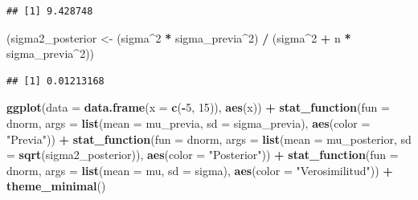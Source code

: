 \documentclass[
  12pt,
]{book}
\newenvironment{Shaded}{\begin{snugshade}}{\end{snugshade}}
\newcommand{\DataTypeTok}[1]{\textcolor[rgb]{0.13,0.29,0.53}{#1}}
\newcommand{\DecValTok}[1]{\textcolor[rgb]{0.00,0.00,0.81}{#1}}
\newcommand{\KeywordTok}[1]{\textcolor[rgb]{0.13,0.29,0.53}{\textbf{#1}}}
\newcommand{\NormalTok}[1]{#1}
\newcommand{\OperatorTok}[1]{\textcolor[rgb]{0.81,0.36,0.00}{\textbf{#1}}}
\newcommand{\StringTok}[1]{\textcolor[rgb]{0.31,0.60,0.02}{#1}}
\begin{document}
\begin{verbatim}
## [1] 9.428748
\end{verbatim}

\begin{Shaded}
\begin{Highlighting}[]
\NormalTok{(sigma2\_posterior \textless{}{-}}\StringTok{ }\NormalTok{(sigma}\OperatorTok{\^{}}\DecValTok{2} \OperatorTok{*}\StringTok{ }\NormalTok{sigma\_previa}\OperatorTok{\^{}}\DecValTok{2}\NormalTok{) }\OperatorTok{/}\StringTok{ }\NormalTok{(sigma}\OperatorTok{\^{}}\DecValTok{2} \OperatorTok{+}\StringTok{ }\NormalTok{n }\OperatorTok{*}\StringTok{ }\NormalTok{sigma\_previa}\OperatorTok{\^{}}\DecValTok{2}\NormalTok{))}
\end{Highlighting}
\end{Shaded}

\begin{verbatim}
## [1] 0.01213168
\end{verbatim}

\begin{Shaded}
\begin{Highlighting}[]
\KeywordTok{ggplot}\NormalTok{(}\DataTypeTok{data =} \KeywordTok{data.frame}\NormalTok{(}\DataTypeTok{x =} \KeywordTok{c}\NormalTok{(}\OperatorTok{{-}}\DecValTok{5}\NormalTok{, }\DecValTok{15}\NormalTok{)), }\KeywordTok{aes}\NormalTok{(x)) }\OperatorTok{+}
\StringTok{  }\KeywordTok{stat\_function}\NormalTok{(}\DataTypeTok{fun =}\NormalTok{ dnorm, }\DataTypeTok{args =} \KeywordTok{list}\NormalTok{(}\DataTypeTok{mean =}\NormalTok{ mu\_previa, }\DataTypeTok{sd =}\NormalTok{ sigma\_previa), }\KeywordTok{aes}\NormalTok{(}\DataTypeTok{color =} \StringTok{"Previa"}\NormalTok{)) }\OperatorTok{+}
\StringTok{  }\KeywordTok{stat\_function}\NormalTok{(}\DataTypeTok{fun =}\NormalTok{ dnorm, }\DataTypeTok{args =} \KeywordTok{list}\NormalTok{(}\DataTypeTok{mean =}\NormalTok{ mu\_posterior, }\DataTypeTok{sd =} \KeywordTok{sqrt}\NormalTok{(sigma2\_posterior)), }\KeywordTok{aes}\NormalTok{(}\DataTypeTok{color =} \StringTok{"Posterior"}\NormalTok{)) }\OperatorTok{+}
\StringTok{  }\KeywordTok{stat\_function}\NormalTok{(}\DataTypeTok{fun =}\NormalTok{ dnorm, }\DataTypeTok{args =} \KeywordTok{list}\NormalTok{(}\DataTypeTok{mean =}\NormalTok{ mu, }\DataTypeTok{sd =}\NormalTok{ sigma), }\KeywordTok{aes}\NormalTok{(}\DataTypeTok{color =} \StringTok{"Verosimilitud"}\NormalTok{)) }\OperatorTok{+}
\StringTok{  }\KeywordTok{theme\_minimal}\NormalTok{()}
\end{Highlighting}
\end{Shaded}
\end{document}
